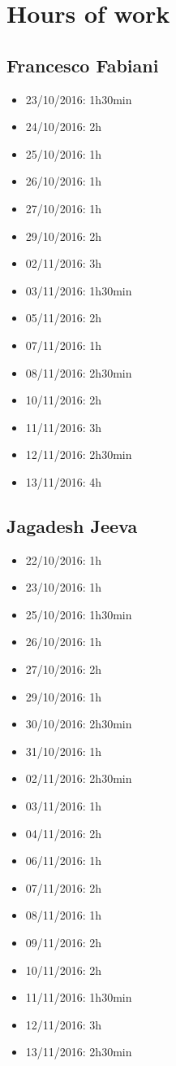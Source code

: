 \chapter{Hours of work}

\section{Francesco Fabiani}
\begin{itemize}
	\item 23/10/2016: 1h30min
	\item 24/10/2016: 2h
	\item 25/10/2016: 1h
	\item 26/10/2016: 1h
	\item 27/10/2016: 1h
	\item 29/10/2016: 2h
	\item 02/11/2016: 3h
	\item 03/11/2016: 1h30min
	\item 05/11/2016: 2h
	\item 07/11/2016: 1h
	\item 08/11/2016: 2h30min
	\item 10/11/2016: 2h
	\item 11/11/2016: 3h
	\item 12/11/2016: 2h30min
	\item 13/11/2016: 4h
\end{itemize}

\section{Jagadesh Jeeva}
\begin{itemize}
	\item 22/10/2016: 1h
	\item 23/10/2016: 1h
	\item 25/10/2016: 1h30min
	\item 26/10/2016: 1h
	\item 27/10/2016: 2h
	\item 29/10/2016: 1h
	\item 30/10/2016: 2h30min
	\item 31/10/2016: 1h
	\item 02/11/2016: 2h30min
	\item 03/11/2016: 1h
	\item 04/11/2016: 2h
	\item 06/11/2016: 1h
	\item 07/11/2016: 2h
	\item 08/11/2016: 1h
	\item 09/11/2016: 2h
	\item 10/11/2016: 2h
	\item 11/11/2016: 1h30min
	\item 12/11/2016: 3h
	\item 13/11/2016: 2h30min
\end{itemize}


